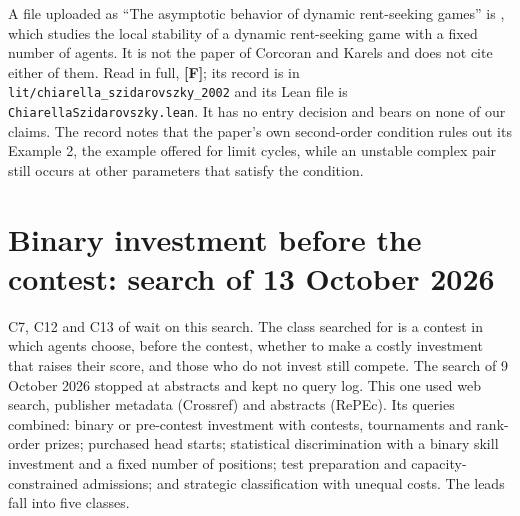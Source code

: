 \documentclass[11pt,a4paper]{article}
\begin{document}
A file uploaded as ``The asymptotic behavior of dynamic rent-seeking games'' is
\citet{ChiarellaSzidarovszky2002}, which studies the local stability of a
dynamic rent-seeking game with a fixed number of agents. It is not the paper
of Corcoran and Karels and does not cite either of them. Read in full,
\textbf{[F]}; its record is in \texttt{lit/chiarella\_szidarovszky\_2002} and its
Lean file is \texttt{ChiarellaSzidarovszky.lean}. It has no entry decision and
bears on none of our claims. The record notes that the paper's own
second-order condition rules out its Example 2, the example offered for
limit cycles, while an unstable complex pair still occurs at other parameters
that satisfy the condition.

\section{Binary investment before the contest: search of 13 October 2026}
\label{sec:binary-search}

C7, C12 and C13 of  wait on this search. The class
searched for is a contest in which agents choose, before the contest, whether
to make a costly investment that raises their score, and those who do not
invest still compete. The search of 9 October 2026 stopped at abstracts and
kept no query log. This one used web search, publisher metadata (Crossref) and
abstracts (RePEc). Its queries combined: binary or pre-contest investment with
contests, tournaments and rank-order prizes; purchased head starts;
statistical discrimination with a binary skill investment and a fixed number
of positions; test preparation and capacity-constrained admissions; and
strategic classification with unequal costs. The leads fall into five
classes.
\end{document}
